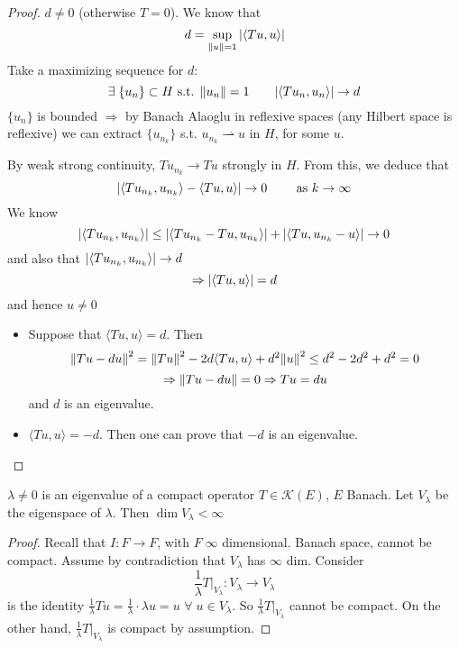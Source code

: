 \begin{proof}
    \(d \neq 0\) (otherwise \(T=0\)). We know that
    \[
        d = \sup_{\norm{u}=1} \abs{\langle Tu, u\rangle}
    \]
    Take a maximizing sequence for \(d\):
    \[
        \exists \; \{u_n\} \subset H \text{ s.t. } \norm{u_n}=1 \qquad \abs{\langle Tu_n, u_n\rangle} \to d    
    \]
    \(\{u_n\}\) is bounded \(\Rightarrow\) by Banach Alaoglu in reflexive spaces (any Hilbert space is reflexive) we can extract \(\{u_{n_k}\}\) s.t. \(u_{n_k} \rightharpoonup u\)  in \(H\), for some \(u\).

    By weak strong continuity, \(T u_{n_k} \to Tu\) strongly in \(H\). From this, we deduce that 
    \[
        \abs{ \langle T u_{n_k}, u_{n_k}\rangle - \langle Tu, u\rangle} \to 0 \qquad \text{ as } k \to \infty    
    \]
    We know
    \[
        \abs{ \langle Tu_{n_k}, u_{n_k}\rangle} \leq \abs{\langle T u_{n_k} - Tu, u_{n_k}\rangle} + \abs{ \langle Tu, u_{n_k} - u\rangle} \to 0
    \]
    and also that \(\abs{\langle T u_{n_k}, u_{n_k}\rangle} \to d\)
    \[
        \Rightarrow \abs{\langle Tu, u\rangle} = d
    \]
    and hence \(u \neq 0\)

    \begin{itemize}
        \item Suppose that \(\langle Tu, u\rangle = d\). Then
        \[
            \norm{Tu- du}^2 = \norm{Tu}^2 - 2d \langle Tu, u\rangle + d^2 \norm{u}^2 \leq d^2 - 2d^2 + d^2 = 0
        \]
        \[
            \Rightarrow \norm{Tu - du} = 0 \Rightarrow Tu = du
        \]
        and \(d\) is an eigenvalue.
        \item \(\langle Tu, u\rangle = -d\). Then one can prove that \(-d\) is an eigenvalue.
    \end{itemize}
\end{proof}

\begin{proposition}\label{prop_2_spect}
    \(\lambda \neq 0\) is an eigenvalue of a compact operator \(T \in \mathcal{K}(E)\), \(E \) Banach. Let \(V_\lambda\) be the eigenspace of \(\lambda\). Then \(\dim V_\lambda < \infty\)
\end{proposition}
\begin{proof}
    Recall that \(I: F \to F \), with \(F  \; \infty\) dimensional. Banach space, cannot be compact. Assume by contradiction that \(V_\lambda\) has \(\infty\) dim. Consider
    \[
        \frac{1}{\lambda} T |_{V_\lambda}: V_\lambda \to V_\lambda 
    \]
    is the identity \(\frac{1}{\lambda} T u = \frac{1}{\lambda} \cdot \lambda u = u\) \(\forall\; u \in V_\lambda\). 
    So \(\frac{1}{\lambda} T |_{V_\lambda}\) cannot be compact. On the other hand, \(\frac{1}{\lambda} T |_{V_\lambda}\) is compact by assumption.
\end{proof}


